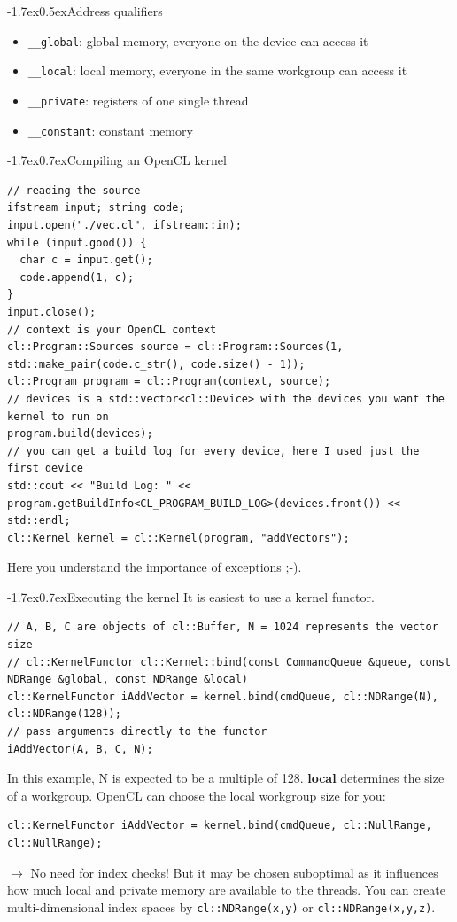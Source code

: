 \documentclass[footexclude,twocolumn,DIV25,fontsize=10pt]{scrreprt}
\makeatletter
\renewcommand{\section}{\@startsection{section}{1}{0mm}
	{-1.7ex}{0.7ex}{\normalfont\large\bfseries}}
\renewcommand{\subsection}{\@startsection{subsection}{2}{0mm}
	{-1.7ex}{0.5ex}{\normalfont\normalsize\bfseries}}
\makeatother
\begin{document}
\subsection{Address qualifiers}
\begin{itemize}
\item \verb*+__global+: global memory, everyone on the device can access it
\item \verb*+__local+: local memory, everyone in the same workgroup can access it
\item \verb*+__private+: registers of one single thread
\item \verb*+__constant+: constant memory
\end{itemize}

\section{Compiling an OpenCL kernel}
\begin{lstlisting}[breaklines=true,frame=tb]
// reading the source
ifstream input; string code;
input.open("./vec.cl", ifstream::in);
while (input.good()) {
  char c = input.get();
  code.append(1, c);
}
input.close();
// context is your OpenCL context
cl::Program::Sources source = cl::Program::Sources(1, std::make_pair(code.c_str(), code.size() - 1));
cl::Program program = cl::Program(context, source);
// devices is a std::vector<cl::Device> with the devices you want the kernel to run on
program.build(devices);
// you can get a build log for every device, here I used just the first device
std::cout << "Build Log: " << program.getBuildInfo<CL_PROGRAM_BUILD_LOG>(devices.front()) << std::endl;
cl::Kernel kernel = cl::Kernel(program, "addVectors");
\end{lstlisting}
Here you understand the importance of exceptions ;-).

\section{Executing the kernel}
It is easiest to use a kernel functor.
\begin{lstlisting}[breaklines=true,frame=tb]
// A, B, C are objects of cl::Buffer, N = 1024 represents the vector size
// cl::KernelFunctor cl::Kernel::bind(const CommandQueue &queue, const NDRange &global, const NDRange &local)
cl::KernelFunctor iAddVector = kernel.bind(cmdQueue, cl::NDRange(N), cl::NDRange(128));
// pass arguments directly to the functor
iAddVector(A, B, C, N);
\end{lstlisting}
In this example, N is expected to be a multiple of 128.
\textbf{local} determines the size of a workgroup.
OpenCL can choose the local workgroup size for you:
\begin{lstlisting}[breaklines=true,frame=tb]
cl::KernelFunctor iAddVector = kernel.bind(cmdQueue, cl::NullRange, cl::NullRange);
\end{lstlisting}
$\rightarrow$ No need for index checks!
But it may be chosen suboptimal as it influences how much local and private memory are available to the threads. 
You can create multi-dimensional index spaces by \verb*+cl::NDRange(x,y)+ or \verb*+cl::NDRange(x,y,z)+.
\end{document}
